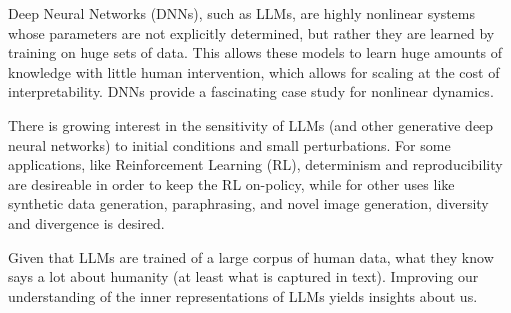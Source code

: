 \documentclass[a4paper,12pt]{article}
\begin{document}
Deep Neural Networks (DNNs), such as LLMs, are highly nonlinear systems whose parameters are not explicitly determined, but rather they are learned by training on huge sets of data.
This allows these models to learn huge amounts of knowledge with little human intervention, which allows for scaling at the cost of interpretability.
DNNs provide a fascinating case study for nonlinear dynamics.

There is growing interest in the sensitivity of LLMs (and other generative deep neural networks) to initial conditions and small perturbations. For some applications, like Reinforcement Learning (RL), determinism and reproducibility are desireable in order to keep the RL on-policy, while for other uses like synthetic data generation, paraphrasing, and novel image generation, diversity and divergence is desired.

Given that LLMs are trained of a large corpus of human data, what they know says a lot about humanity (at least what is captured in text). Improving our understanding of the inner representations of LLMs yields insights about us.

\end{document}
